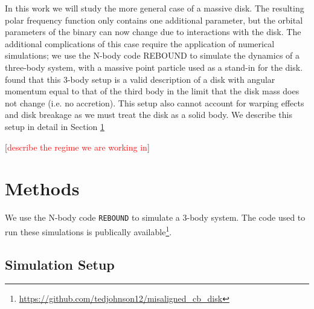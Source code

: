 \documentclass[twocolumn]{aastex631}
\newcommand\codeurl[0]{\url{https://github.com/tedjohnson12/misaligned_cb_disk}}
\newcommand\question[1]{[\textcolor{red}{#1}]}
\begin{document}
In this work we will study the more general case of a massive disk. The resulting polar frequency function only contains one
additional parameter, but the orbital parameters of the binary can now change due to interactions with the disk. The additional
complications of this case require the application of numerical simulations; we use the N-body code REBOUND \citep{rebound} to simulate the
dynamics of a three-body system, with a massive point particle used as a stand-in for the disk. \citet{abod2022} found that this 3-body
setup is a valid description of a disk with angular momentum equal to that of the third body in the limit that the disk mass does not change
(i.e. no accretion). This setup also cannot account for warping effects and disk breakage as we must treat the disk as a solid body. 
We describe this setup in detail in Section \ref{sec:methods}

\question{describe the regime we are working in}


\section{Methods}
\label{sec:methods}
We use the N-body code \texttt{REBOUND} \citep{rebound} to simulate a 3-body system. The code used to run these simulations is publically
available\footnote{\codeurl}.

\subsection{Simulation Setup}
\label{subsec:setup}
\end{document}
